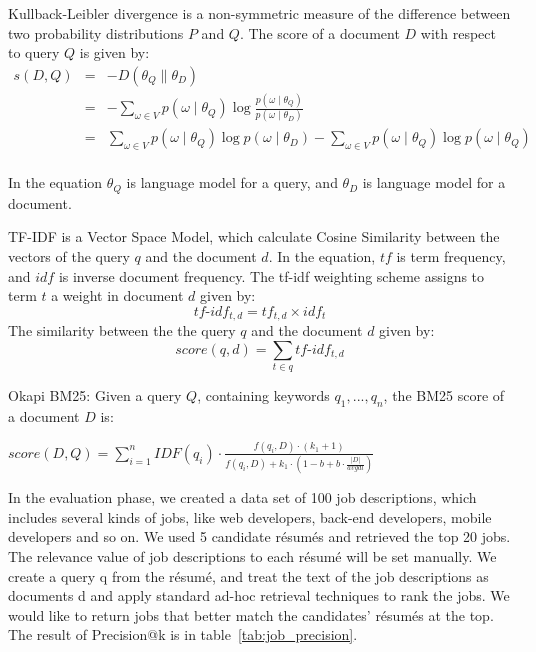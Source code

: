Kullback-Leibler divergence is a non-symmetric measure of the difference between two probability distributions $P$ and $Q$. The score of a document $D$ with respect to query $Q$ is given by:
\begin{equation}
    \begin{array}{rcl}
        s(D,Q) & = & -D( \theta_Q \parallel  \theta_D )\\
               & = &- \sum_{ \omega \in V } p (\omega \mid \theta_Q) \log \frac{ p (\omega \mid \theta_Q )}{p(\omega \mid \theta_D)} \\
               & = & \sum_{ \omega \in V } p (\omega \mid \theta_Q) \log p (\omega \mid \theta_D ) -  \sum_{ \omega \in V } p (\omega \mid \theta_Q) \log p (\omega \mid \theta_Q )  \\

    \end{array}
\end{equation}

In the equation $\theta_Q$ is language model for a query, and  $\theta_D$ is language model for a document.

TF-IDF is a Vector Space Model, which calculate Cosine Similarity between the vectors of the query $q$ and the document $d$. In the equation, $tf$ is term frequency, and $idf$ is inverse document frequency. The tf-idf weighting scheme assigns to term $t$ a weight in document $d$ given by:
$$ tf\text{-}idf_{t,d} = tf_{t,d} \times idf_{t} $$
The similarity between the  the query $q$ and the document $d$ given by:
$$ score(q,d) =  \sum_{t \in q }  tf\text{-}idf_{t,d} $$

Okapi BM25: Given a query $Q$, containing keywords $q_1, ..., q_n$, the BM25 score of a document $D$ is:

$ score(D,Q) = \sum_{ i=1 }^{n} IDF(q_i) \cdot   \frac {f(q_i,D) \cdot (k_1 + 1)}{f(q_i,D) + k_1 \cdot ( 1-b + b\cdot \frac { \left | D \right |}{avgdl})}  $

In the evaluation phase, we created a data set of 100 job descriptions, which includes several kinds of jobs, like web developers, back-end developers, mobile developers and so on. We used 5 candidate r\'esum\'es and retrieved the top 20 jobs.  The relevance value of job descriptions to each r\'esum\'e will be set manually. We create a query q from the r\'esum\'e, and treat the text of the job descriptions as documents d and apply standard ad-hoc retrieval techniques to rank the jobs.    We would like to return jobs that better match the candidates' r\'esum\'es at the top. The result of Precision@k is in table~\ref{tab:job_precision}.


